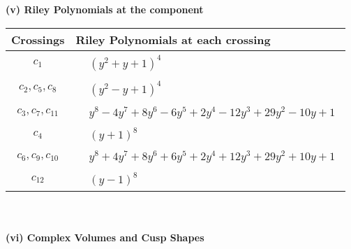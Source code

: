 \documentclass[1p]{elsarticle_modified}
\theoremstyle{definition}
\begin{document}
\newpage\renewcommand{\arraystretch}{1}
\flushleft \textbf{(v) Riley Polynomials at the component}\newline \\
\begin{tabular}{m{50pt}|m{274pt}}
Crossings & \hspace{64pt}Riley Polynomials at each crossing \\
\hline $$\begin{aligned}c_{1}\end{aligned}$$&$\begin{aligned}
&(y^2+y+1)^4
\end{aligned}$\\
\hline $$\begin{aligned}c_{2},c_{5},c_{8}\end{aligned}$$&$\begin{aligned}
&(y^2- y+1)^4
\end{aligned}$\\
\hline $$\begin{aligned}c_{3},c_{7},c_{11}\end{aligned}$$&$\begin{aligned}
&y^8-4 y^7+8 y^6-6 y^5+2 y^4-12 y^3+29 y^2-10 y+1
\end{aligned}$\\
\hline $$\begin{aligned}c_{4}\end{aligned}$$&$\begin{aligned}
&(y+1)^8
\end{aligned}$\\
\hline $$\begin{aligned}c_{6},c_{9},c_{10}\end{aligned}$$&$\begin{aligned}
&y^8+4 y^7+8 y^6+6 y^5+2 y^4+12 y^3+29 y^2+10 y+1
\end{aligned}$\\
\hline $$\begin{aligned}c_{12}\end{aligned}$$&$\begin{aligned}
&(y-1)^8
\end{aligned}$\\
\hline
\end{tabular}\\~\\
\newpage\flushleft \textbf{(vi) Complex Volumes and Cusp Shapes}
\end{document}
